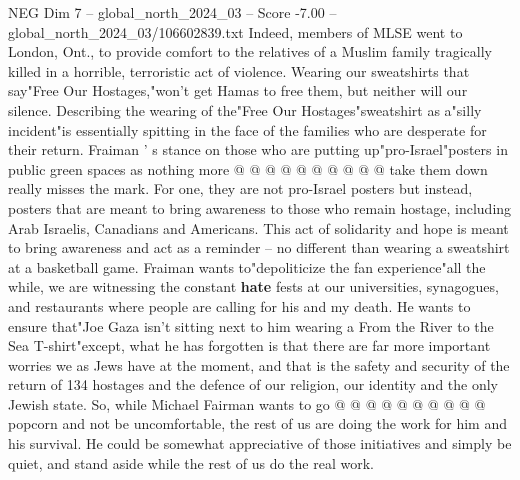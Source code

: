 \begin{textsample}{NEG Dim 7 – global\_north\_2024\_03 – Score -7.00 – global\_north\_2024\_03/106602839.txt}
Indeed, members of MLSE went to London, Ont., to provide comfort to the relatives of a Muslim family tragically killed in a horrible, terroristic act of violence.
Wearing our sweatshirts that say"Free Our Hostages,"won't get Hamas to free them, but neither will our silence.
Describing the wearing of the"Free Our Hostages"sweatshirt as a"silly incident"is essentially spitting in the face of the families who are desperate for their return.
Fraiman ' s stance on those who are putting up"pro-Israel"posters in public green spaces as nothing more @ @ @ @ @ @ @ @ @ @ take them down really misses the mark.
For one, they are not pro-Israel posters but instead, posters that are meant to bring awareness to those who remain hostage, including Arab Israelis, Canadians and Americans.
This act of solidarity and hope is meant to bring awareness and act as a reminder -- no different than wearing a sweatshirt at a basketball game.
Fraiman wants to"depoliticize the fan experience"all the while, we are witnessing the constant \textbf{hate} fests at our universities, synagogues, and restaurants where people are calling for his and my death.
He wants to ensure that"Joe Gaza isn't sitting next to him wearing a From the River to the Sea T-shirt"except, what he has forgotten is that there are far more important worries we as Jews have at the moment, and that is the safety and security of the return of 134 hostages and the defence of our religion, our identity and the only Jewish state.
So, while Michael Fairman wants to go @ @ @ @ @ @ @ @ @ @ popcorn and not be uncomfortable, the rest of us are doing the work for him and his survival.
He could be somewhat appreciative of those initiatives and simply be quiet, and stand aside while the rest of us do the real work.

\end{textsample}
